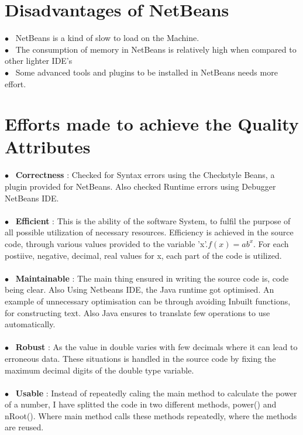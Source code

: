 \documentclass[10pt]{article}
\begin{document}
\section*{\normalsize Disadvantages of NetBeans}
$\bullet$~ NetBeans is a kind of slow to load on the Machine.
\\
$\bullet$~ The consumption of memory in NetBeans is relatively high when compared to other lighter IDE's
\\
$\bullet$~ Some advanced tools and plugins to be installed in NetBeans needs more effort.

\clearpage

\section*{\textbf{Efforts made to achieve the Quality Attributes } }

$\bullet$~ \textbf{Correctness} : Checked for Syntax errors using the Checkstyle Beans, a plugin provided for NetBeans. Also checked Runtime errors using Debugger NetBeans IDE.
\\
\\$\bullet$~ \textbf{Efficient} : This is the ability of the software System, to fulfil the purpose of all possible utilization of necessary resources. Efficiency is achieved in the source code, through various values provided to the variable 'x'.\( f(x) = ab^x \). For each postiive, negative, decimal, real values for x, each part of the code is utilized.
\\
\\
$\bullet$~ \textbf{Maintainable} : The main thing ensured in writing the source code is, code being clear. Also Using Netbeans IDE, the Java runtime got optimised. An example of unnecessary optimisation can be through avoiding Inbuilt functions, for constructing text. Also Java ensures to translate few operations to use automatically.
\\
\\
$\bullet$~ \textbf{Robust} : As the value in double varies with few decimals where it can lead to erroneous data. These situations is handled in the source code by fixing the maximum decimal digits of the double type variable.
\\
\\
$\bullet$~ \textbf{Usable} : Instead of repeatedly caling the main method to calculate the power of a number, I have splitted the code in two different methods, power() and nRoot(). Where main method calls these methods repeatedly, where the methods are reused.
\end{document}
